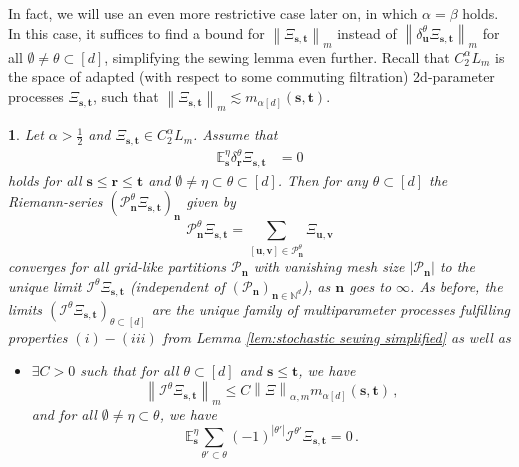 \documentclass[11pt,oneside,english,reqno]{amsart}
\numberwithin{equation}{section}
\numberwithin{figure}{section}
\theoremstyle{plain}
\theoremstyle{definition}
\theoremstyle{remark}
\theoremstyle{plain}
\theoremstyle{plain}
\theoremstyle{plain}
\newtheorem{cor}[thm]{\protect\corollaryname}
\theoremstyle{plain}
\theoremstyle{plain}
\providecommand{\corollaryname}{Corollary}
\newcommand{\cI}{\mathcal{I}}
\newcommand{\cP}{\mathcal{P}}
\newcommand{\EE}{\mathbb{E}}
\newcommand{\NN}{\mathbb{N}}
\newcommand{\bn}{\mathbf{n}}
\newcommand{\br}{\mathbf{r}}
\newcommand{\bu}{\mathbf{u}}
\newcommand{\bv}{\mathbf{v}}
\newcommand{\bs}{\mathbf{s}}
\newcommand{\bt}{\mathbf{t}}
\newcommand{\norm}[1]{\left\lVert #1\right\rVert}
\newcommand{\abs}[1]{\left\lvert #1\right\rvert}
\begin{document}
\noindent In fact, we will use an even more restrictive case later on, in which $\alpha = \beta$ holds. In this case, it suffices to find a bound for $\norm{\Xi_{\bs,\bt}}_m$ instead of $\norm{\delta^\theta_\bu\Xi_{\bs,\bt}}_m$ for all $\emptyset\neq\theta\subset[d]$, simplifying the sewing lemma even further. Recall that $C^\alpha_2 L_m$ is the space of adapted (with respect to some commuting filtration) 2d-parameter processes $\Xi_{\bs,\bt}$, such that $\norm{\Xi_{\bs,\bt}}_m\lesssim m_{\alpha[d]}(\bs,\bt)$.

\begin{cor}\label{cor:sewing_alpha=beta}
    Let $\alpha>\frac 12$ and $\Xi_{\bs,\bt}\in C^\alpha_2 L_m$. Assume that
%
    \begin{align*}
        \EE^\eta_\bs\delta_\br^\theta\Xi_{\bs,\bt} &= 0
    \end{align*}
%
    holds for all $\bs\le\br\le\bt$ and $\emptyset\neq\eta\subset\theta\subset[d]$. Then for any $\theta\subset[d]$ the Riemann-series $(\cP^\theta_\bn\Xi_{\bs,\bt})_\bn$  given by
%
    \begin{equation*}
       \cP^\theta_\bn\Xi_{\bs,\bt}= \sum_{[\bu,\bv]\in\cP^\theta_\bn} \Xi_{\bu,\bv}
    \end{equation*}
%
    converges for all grid-like partitions $\cP_\bn$ with vanishing mesh size $\abs{\cP_\bn}$ to the unique limit  $\mathcal{I}^{\theta}\Xi_{\bs, \bt}$ (independent of $(\cP_\bn)_{\bn\in\NN^d}$), as $\bn$ goes to $\infty$. As before, the limits $(\cI^\theta\Xi_{\bs,\bt})_{\theta\subset[d]}$ are the unique family of multiparameter processes fulfilling properties $(i) - (iii)$ from Lemma \ref{lem:stochastic sewing simplified} as well as

    \begin{itemize}
        \item[(iv')] $\exists C>0$ such that for all $\theta\subset[d]$ and $\bs\le\bt$, we have
        \begin{equation}\label{ineq:uniqueness23}
            \norm{\cI^\theta \Xi_{\bs,\bt}}_m \le C\norm{\Xi}_{\alpha,m}m_{\alpha[d]}(\bs,\bt)\,,
        \end{equation}
        and for all $\emptyset\neq\eta\subset\theta$, we have
        \begin{equation}
            \EE^\eta_\bs\sum_{\theta'\subset\theta} (-1)^{\abs{\theta'}}\cI^{\theta'}\Xi_{\bs,\bt} = 0\,.\label{eq:uniqueness23}
        \end{equation}
    \end{itemize}
\end{cor}
\end{document}
